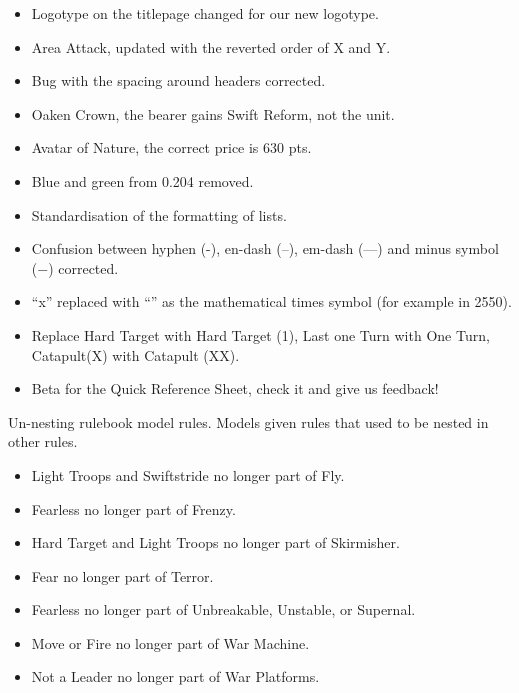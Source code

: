 
\subtitle{0.205.2}

\begin{itemize}
\item Logotype on the titlepage changed for our new logotype.
\item Area Attack, updated with the reverted order of X and Y.
\item Bug with the spacing around headers corrected.
\item Oaken Crown, the bearer gains Swift Reform, not the unit.
\end{itemize}

\subtitle{0.205.1}

\begin{itemize}
\item Avatar of Nature, the correct price is 630 pts.
\end{itemize}

\subtitle{0.205.0}

\begin{itemize}
\item Blue and green from 0.204 removed.
\item Standardisation of the formatting of lists.
\item Confusion between hyphen (-), en-dash (--), em-dash (---) and minus symbol (−) corrected.
\item \enquote{x} replaced with \enquote{\timess{}} as the mathematical times symbol (for example in 25\timess{}50).
\item Replace Hard Target with Hard Target (1), Last one Turn with One Turn, Catapult(X) with Catapult (X\timess{}X).
\item Beta for the Quick Reference Sheet, check it and give us feedback!
\end{itemize}

Un-nesting rulebook model rules. Models given rules that used to be nested in other rules.
\begin{itemize}
\item Light Troops and Swiftstride no longer part of Fly.
\item Fearless no longer part of Frenzy.
\item Hard Target and Light Troops no longer part of Skirmisher.
\item Fear no longer part of Terror.
\item Fearless no longer part of Unbreakable, Unstable, or Supernal.
\item Move or Fire no longer part of War Machine.
\item Not a Leader no longer part of War Platforms.
\end{itemize}

